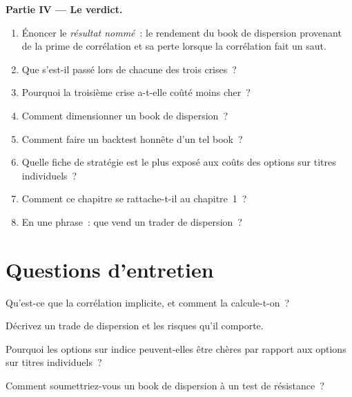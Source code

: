 \begin{problem}
\medskip\noindent\textbf{Partie IV --- Le verdict.}
\begin{enumerate}[resume]
\item Énoncer le \emph{résultat nommé}~: le rendement du book de dispersion provenant de la prime de corrélation et sa perte lorsque la corrélation fait un saut.
\item Que s'est-il passé lors de chacune des trois crises~?
\item Pourquoi la troisième crise a-t-elle coûté moins cher~?
\item Comment dimensionner un book de dispersion~?
\item Comment faire un backtest honnête d'un tel book~?
\item Quelle fiche de stratégie est le plus exposé aux coûts des options sur titres individuels~?
\item Comment ce chapitre se rattache-t-il au chapitre~1~?
\item En une phrase~: que vend un trader de dispersion~?
\end{enumerate}
\end{problem}

\section{Questions d'entretien}

\begin{interviewq}\label{iq:s2:dispersion-and-correlation:1}
Qu'est-ce que la corrélation implicite, et comment la calcule-t-on~?
\end{interviewq}

\begin{interviewq}\label{iq:s2:dispersion-and-correlation:2}
Décrivez un trade de dispersion et les risques qu'il comporte.
\end{interviewq}

\begin{interviewq}\label{iq:s2:dispersion-and-correlation:3}
Pourquoi les options sur indice peuvent-elles être chères par rapport aux options sur titres individuels~?
\end{interviewq}

\begin{interviewq}\label{iq:s2:dispersion-and-correlation:4}
Comment soumettriez-vous un book de dispersion à un test de résistance~?
\end{interviewq}

